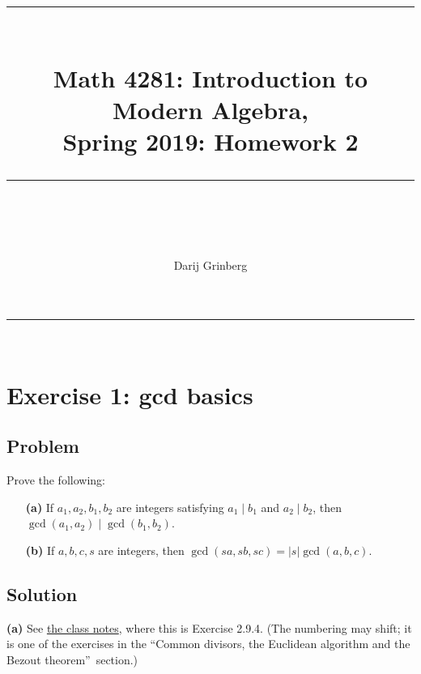 \documentclass[paper=a4, fontsize=12pt]{scrartcl}%
\theoremstyle{plainsl}
\theoremstyle{definition}
\theoremstyle{remark}
\begin{document}
\title{ \\[25pt] \rule{\linewidth}{0.5pt} \\[0.4cm] {\huge Math 4281: Introduction to Modern Algebra, }\\Spring 2019: Homework 2\\\rule{\linewidth}{2pt} \\[0.5cm] }
\author{Darij Grinberg}
\maketitle

\rule{\linewidth}{0.3pt} \\[0.4cm]

\section{Exercise 1: gcd basics}

\subsection{Problem}

Prove the following:

\begin{enumerate}
\item[\textbf{(a)}] If $a_{1}, a_{2}, b_{1}, b_{2}$ are integers satisfying
$a_{1} \mid b_{1}$ and $a_{2} \mid b_{2}$, then $\gcd\left(  a_{1}, a_{2}
\right)  \mid\gcd\left(  b_{1}, b_{2} \right)  $.

\item[\textbf{(b)}] If $a, b, c, s$ are integers, then $\gcd\left(  sa, sb, sc
\right)  = \left|  s \right|  \gcd\left(  a, b, c \right)  $.
\end{enumerate}

\subsection{Solution}

\textbf{(a)} See
\href{http://www-users.math.umn.edu/~dgrinber/19s/notes.pdf}{the class notes},
where this is Exercise 2.9.4. (The numbering may shift; it is one of the
exercises in the \textquotedblleft Common divisors, the Euclidean algorithm
and the Bezout theorem\textquotedblright\ section.)
\end{document}

